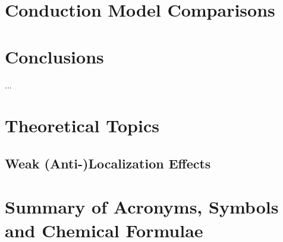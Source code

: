 \documentclass{report}
\begin{document}
\chapter{Conduction Model Comparisons}
\label{ch:models}

\chapter{Conclusions}
\label{ch:conclusions}
     ...
\appendix
%
\chapter{Theoretical Topics}
\section{Weak (Anti-)Localization Effects}\label{sec:wl}

%
\chapter{Summary of Acronyms, Symbols and Chemical Formulae}
    
%
\printbibliography
\end{document}

